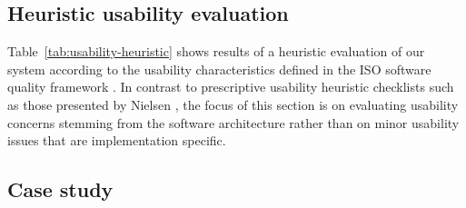 
\subsection{Heuristic usability evaluation}

Table~\ref{tab:usability-heuristic} shows results of a heuristic evaluation of our system according to
the usability characteristics defined in the ISO software quality
framework \cite{ISO2011}. In contrast to prescriptive usability heuristic
checklists such as those presented by Nielsen \cite{Nielsen1990}, the focus of this section is on
evaluating usability concerns stemming from the software architecture
\cite{Folmer2004} rather than on minor usability issues that are implementation
specific.

\subsection{Case study} \label{sec:deident-casestudy}

